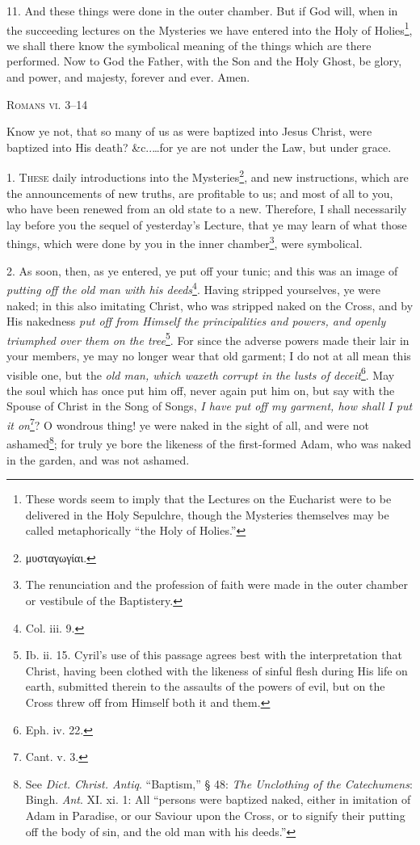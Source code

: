 11. And these things were done in the outer chamber. But if God will, when in the succeeding lectures on the Mysteries we have entered into the Holy of Holies\footnote{These words seem to imply that the Lectures on the Eucharist were to be delivered in the Holy Sepulchre, though the Mysteries themselves may be called metaphorically “the Holy of Holies.”}, we shall there know the symbolical meaning of the things which are there performed. Now to God the Father, with the Son and the Holy Ghost, be glory, and power, and majesty, forever and ever. Amen.


\textsc{Romans vi. 3–14}

Know ye not, that so many of us as were baptized into Jesus Christ, were baptized into His death? \&c..…for ye are not under the Law, but under grace.

1. \textsc{These} daily introductions into the Mysteries\footnote{\textgreek{μυσταγωγίαι}.}, and new instructions, which are the announcements of new truths, are profitable to us; and most of all to you, who have been renewed from an old state to a new. Therefore, I shall necessarily lay before you the sequel of yesterday’s Lecture, that ye may learn of what those things, which were done by you in the inner chamber\footnote{The renunciation and the profession of faith were made in the outer chamber or vestibule of the Baptistery.}, were symbolical.

2. As soon, then, as ye entered, ye put off your tunic; and this was an image of \emph{putting off the old man with his deeds}\footnote{Col. iii. 9.}. Having stripped yourselves, ye were naked; in this also imitating Christ, who was stripped naked on the Cross, and by His nakedness \emph{put off from Himself the principalities and powers, and openly triumphed over them on the tree}\footnote{Ib. ii. 15. Cyril’s use of this passage agrees best with the interpretation that Christ, having been clothed with the likeness of sinful flesh during His life on earth, submitted therein to the assaults of the powers of evil, but on the Cross threw off from Himself both it and them.}. For since the adverse powers made their lair in your members, ye may no longer wear that old garment; I do not at all mean this visible one, but the \emph{old man, which waxeth corrupt in the lusts of deceit}\footnote{Eph. iv. 22.}. May the soul which has once put him off, never again put him on, but say with the Spouse of Christ in the Song of Songs, \emph{I have put off my garment, how shall I put it on}\footnote{Cant. v. 3.}? O wondrous thing! ye were naked in the sight of all, and were not ashamed\footnote{See \emph{Dict. Christ. Antiq}. “Baptism,” § 48: \emph{The Unclothing of the Catechumens}: Bingh. \emph{Ant}. XI. xi. 1: All “persons were baptized naked, either in imitation of Adam in Paradise, or our Saviour upon the Cross, or to signify their putting off the body of sin, and the old man with his deeds.”}; for truly ye bore the likeness of the first-formed Adam, who was naked in the garden, and was not ashamed.

